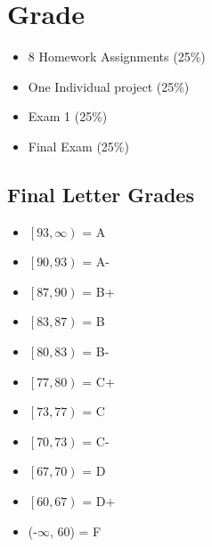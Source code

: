 \documentclass{article}\usepackage[]{graphicx}\usepackage[]{color}
\begin{document}

\section*{Grade}
\begin{itemize}
\item 8 Homework Assignments (25\%)
\item One Individual project (25\%)
\item Exam 1 (25\%) 
\item Final Exam (25\%)
\end{itemize}

\subsection*{Final Letter Grades}
\begin{itemize}
\item $\left[93,\infty\right)$ = A
\item $\left[90,93\right)$ = A-
\item $\left[87,90\right)$ = B+
\item $\left[83,87\right)$ = B
\item $\left[80,83\right)$ = B-
\item $\left[77,80\right)$ = C+
\item $\left[73,77\right)$ = C
\item $\left[70,73\right)$ = C-
\item $\left[67,70\right)$ = D
\item $\left[60,67\right)$ = D+
\item (-$\infty$, 60) = F
\end{itemize}
\end{document}

